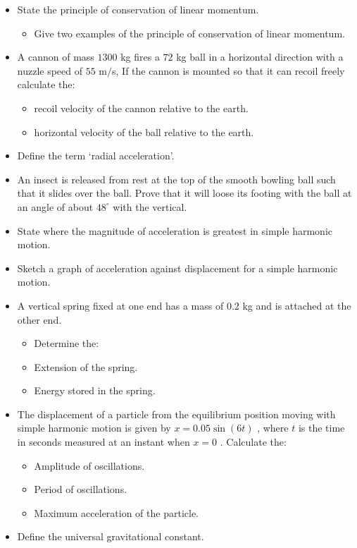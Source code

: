 \documentclass{article}
\begin{document}
\begin{itemize}
\item State the principle of conservation of linear momentum. 
 \begin{itemize}
\item Give two examples of the principle of conservation of linear momentum. 
\end{itemize}
\item A cannon of mass $ 1300$ kg fires a $ 72$ kg ball in a horizontal direction with a nuzzle speed of $ 55$ m$/$s, If the cannon is mounted so that it can recoil freely calculate the:
 \begin{itemize}
\item  recoil velocity of the cannon relative to the earth. 
\item horizontal velocity of the ball relative to the earth. 
\end{itemize}
\item Define the term ‘radial acceleration’. 
\item An insect is released from rest at the top of the smooth bowling ball such that it slides over the ball. Prove that it will loose its footing with the ball at an angle of about $ 48^{\circ}$ with the vertical.
\item State where the magnitude of acceleration is greatest in simple harmonic motion.
\item Sketch a graph of acceleration against displacement for a simple harmonic motion.
\item A vertical spring fixed at one end has a mass of $ 0.2$ kg and is attached at the other end.
 \begin{itemize}
\item Determine the:
\item Extension of the spring.
\item Energy stored in the spring.
\end{itemize}
\item The displacement of a particle from the equilibrium position moving with simple harmonic motion is given by $ x=0.05 \sin(6t)$ , where $ t$ is the time in seconds measured at an instant when $ x=0$ .  Calculate the:
 \begin{itemize}
\item Amplitude of oscillations.
\item Period of oscillations. 
\item  Maximum acceleration of the particle. 
\end{itemize}
\item Define the universal gravitational constant.

\end{itemize}
\end{document}
